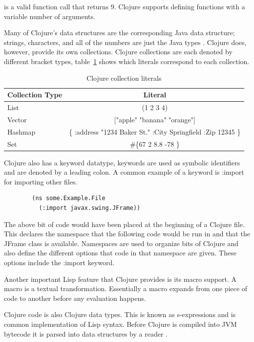 \documentclass[12pt]{article}
\begin{document}
	is a valid function call that returns 9. Clojure supports defining functions with a variable number of arguments. 
	
	Many of Clojure's data structures are the corresponding Java data structure; strings, characters, and all of the numbers are just the Java types \cite{cloj:structs}. Clojure does, however, provide its own collections. Clojure collections are each denoted by different bracket types, table~\ref{coll:table} shows which literals correspond to each collection.
	
	\begin{table}[H]
	\caption{Clojure collection literals\label{coll:table}}	
	\begin{tabular}{ | l | c | }
	\hline
	Collection Type & Literal \\ \hline
	List & (1 2 3 4) \\ \hline
	Vector & ["apple" "banana" "orange"] \\ \hline
	Hashmap & \{ :address "1234 Baker St." :City Springfield :Zip 12345 \} \\ \hline
	Set & \#\{67 2 8.8 -78 \} \\
	\hline
	\end{tabular}
	\end{table}
	
	Clojure also has a keyword datatype, keywords are used as symbolic identifiers and are denoted by a leading colon. A common example of a keyword is :import for importing other files. 
	
	\begin{verbatim}
		(ns some.Example.File
		  (:import javax.swing.JFrame))
	\end{verbatim}
	
	The above bit of code would have been placed at the beginning of a Clojure file. This declares the namespace that the following code would be run in and that the JFrame class is available. Namespaces are used to organize bits of Clojure and also define the different options that code in that namespace are given. These options include the :import keyword.
	
	Another important Lisp feature that Clojure provides is its macro support. A macro is a textual transformation. Essentially a macro expands from one piece of code to another before any evaluation happens.
	
	Clojure code is also Clojure data types. This is known as s-expressions and is common implementation of Lisp syntax. Before Clojure is compiled into JVM bytecode it is parsed into data structures by a reader \cite{wiki}. 
	
\end{document}
